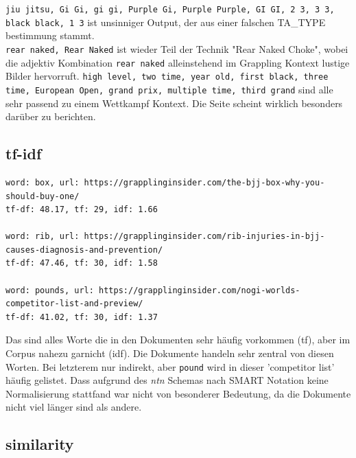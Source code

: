 \noindent \texttt{jiu jitsu, Gi Gi, gi gi, Purple Gi, Purple Purple, GI GI, 2 3, 3 3, black black, 1 3} ist unsinniger Output, der aus einer falschen TA\_TYPE bestimmung stammt. \\

\noindent \texttt{rear naked, Rear Naked} ist wieder Teil der Technik "Rear Naked Choke", wobei die adjektiv Kombination \texttt{rear naked} alleinstehend im Grappling Kontext lustige Bilder hervorruft. \texttt{high level, two time, year old, first black, three time, European Open, grand prix, multiple time, third grand} sind alle sehr passend zu einem Wettkampf Kontext. Die Seite scheint wirklich besonders darüber zu berichten.

\subsection{tf-idf}

{\color{MidnightBlue}
\begin{lstlisting}
word: box, url: https://grapplinginsider.com/the-bjj-box-why-you-should-buy-one/
tf-df: 48.17, tf: 29, idf: 1.66

word: rib, url: https://grapplinginsider.com/rib-injuries-in-bjj-causes-diagnosis-and-prevention/
tf-df: 47.46, tf: 30, idf: 1.58

word: pounds, url: https://grapplinginsider.com/nogi-worlds-competitor-list-and-preview/
tf-df: 41.02, tf: 30, idf: 1.37
\end{lstlisting}}

\noindent Das sind alles Worte die in den Dokumenten sehr häufig vorkommen (tf), aber im Corpus nahezu garnicht (idf). Die Dokumente handeln sehr zentral von diesen Worten. Bei letzterem nur indirekt, aber \texttt{pound} wird in dieser 'competitor list' häufig gelistet. Dass aufgrund des \textit{ntn} Schemas nach SMART Notation keine Normalisierung stattfand war nicht von besonderer Bedeutung, da die Dokumente nicht viel länger sind als andere.

\subsection{similarity}

